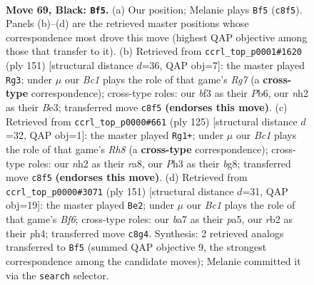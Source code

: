 \documentclass[11pt]{article}
\begin{document}
\clearpage

\begin{figure}[p]\centering
\begin{subfigure}{0.46\textwidth}\centering
\resizebox{\linewidth}{!}{%
\newchessgame
\chessboard[
  setfen={2b5/B3k3/1K6/8/P7/1P3Brp/1R5N/8 b - - 17 69},
  showmover=false,
  pgfstyle=straightmove, color=movearrow, markmove={c8-f5}
]}
\caption{}
\end{subfigure}\hfill
\begin{subfigure}{0.46\textwidth}\centering
\resizebox{\linewidth}{!}{%
\newchessgame
\chessboard[
  setfen={8/4k3/1pR5/1P6/8/2KBb3/6r1/8 b - - 15 76},
  showmover=false,
  pgfstyle=straightmove, color=movearrow, markmove={g2-g3}
]}
\caption{}
\end{subfigure}
\\[4pt]
\begin{subfigure}{0.46\textwidth}\centering
\resizebox{\linewidth}{!}{%
\newchessgame
\chessboard[
  setfen={R5B1/7P/2p5/5PK1/1k6/p7/1b6/7r b - - 0 63},
  showmover=false,
  pgfstyle=straightmove, color=movearrow, markmove={h1-g1}
]}
\caption{}
\end{subfigure}\hfill
\begin{subfigure}{0.46\textwidth}\centering
\resizebox{\linewidth}{!}{%
\newchessgame
\chessboard[
  setfen={4k3/8/3Br3/P1K4p/7P/5b2/3R4/8 b - - 62 76},
  showmover=false,
  pgfstyle=straightmove, color=movearrow, markmove={f3-e2}
]}
\caption{}
\end{subfigure}
\caption{\textbf{Move 69, Black: \texttt{Bf5}.} (a) Our position; Melanie plays \texttt{Bf5} (\texttt{c8f5}). Panels (b)--(d) are the retrieved master positions whose correspondence most drove this move (highest QAP objective among those that transfer to it). (b) Retrieved from \texttt{ccrl\_top\_p0001\#1620} (ply 151) [structural distance $d$=36, QAP obj=7]: the master played \texttt{Rg3}; under $\mu$ our \emph{Bc1} plays the role of that game's \emph{Rg7} (a \textbf{cross-type} correspondence); cross-type roles: our \emph{b}f3 as their \emph{P}b6, our \emph{n}h2 as their \emph{B}e3; transferred move \texttt{c8f5} \textbf{(endorses this move)}. (c) Retrieved from \texttt{ccrl\_top\_p0000\#661} (ply 125) [structural distance $d$=32, QAP obj=1]: the master played \texttt{Rg1+}; under $\mu$ our \emph{Bc1} plays the role of that game's \emph{Rh8} (a \textbf{cross-type} correspondence); cross-type roles: our \emph{n}h2 as their \emph{r}a8, our \emph{P}h3 as their \emph{b}g8; transferred move \texttt{c8f5} \textbf{(endorses this move)}. (d) Retrieved from \texttt{ccrl\_top\_p0000\#3071} (ply 151) [structural distance $d$=31, QAP obj=19]: the master played \texttt{Be2}; under $\mu$ our \emph{Bc1} plays the role of that game's \emph{Bf6}; cross-type roles: our \emph{b}a7 as their \emph{p}a5, our \emph{r}b2 as their \emph{p}h4; transferred move \texttt{c8g4}. Synthesis: 2 retrieved analogs transferred to \texttt{Bf5} (summed QAP objective 9, the strongest correspondence among the candidate moves); Melanie committed it via the \texttt{search} selector.}
\label{fig:thought-m137}
\end{figure}
\end{document}
